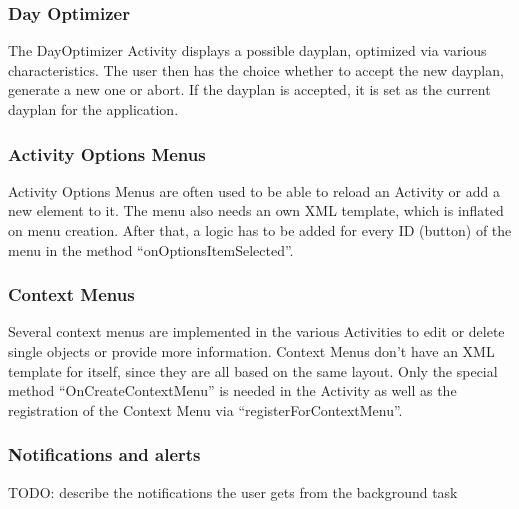 
\subsubsection{Day Optimizer} %
\label{ssub:DayOptimizer}
The DayOptimizer Activity displays a possible dayplan, optimized via various
characteristics. The user then has the choice whether to accept the new
dayplan, generate a new one or abort. If the dayplan is accepted, it is set
as the current dayplan for the application.


\subsubsection{Activity Options Menus} %
\label{ssub:ActivityMenus}
Activity Options Menus are often used to be able to reload an Activity or add
a new element to it. The menu also needs an own XML template, which is
inflated on menu creation. After that, a logic has to be added for every
ID (button) of the menu in the method ``onOptionsItemSelected''.

\subsubsection{Context Menus} %
\label{ssub:ContextMenus}
Several context menus are implemented in the various Activities to edit or
delete single objects or provide more information. Context Menus don't have
an XML template for itself, since they are all based on the same layout. Only
the special method ``OnCreateContextMenu'' is needed in the Activity as well
as the registration of the Context Menu via ``registerForContextMenu''.


\subsubsection{Notifications and alerts} %
TODO: describe the notifications the user gets from the background task
